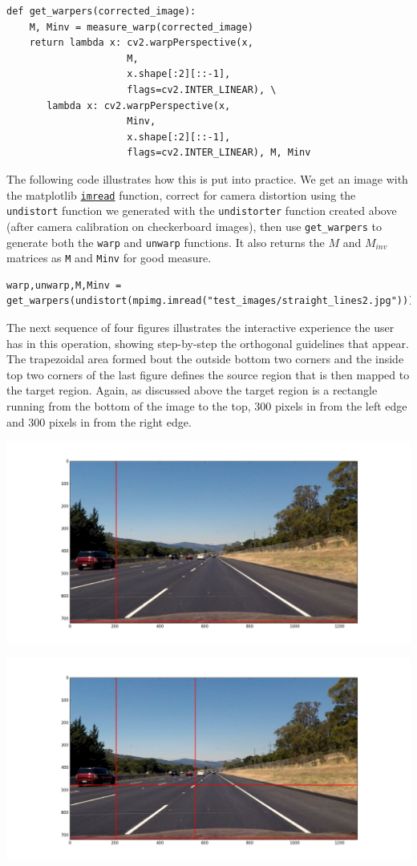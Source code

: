 \documentclass[11pt]{article}
\begin{document}
\begin{verbatim}
def get_warpers(corrected_image):
    M, Minv = measure_warp(corrected_image)
    return lambda x: cv2.warpPerspective(x,
					 M,
					 x.shape[:2][::-1],
					 flags=cv2.INTER_LINEAR), \
	   lambda x: cv2.warpPerspective(x,
					 Minv,
					 x.shape[:2][::-1],
					 flags=cv2.INTER_LINEAR), M, Minv
\end{verbatim}

The following code illustrates how this is put into practice.
We get an image with the matplotlib \href{http://matplotlib.org/api/image_api.html#matplotlib.image.imread}{\texttt{imread}} function, correct
for camera distortion using the \texttt{undistort} function we
generated with the \texttt{undistorter} function created above (after
camera calibration on checkerboard images), then use
\texttt{get\_warpers} to generate both the \texttt{warp} and \texttt{unwarp}
functions.  It also returns the $M$ and $M_{inv}$ matrices as
\texttt{M} and \texttt{Minv} for good measure.

\begin{verbatim}
warp,unwarp,M,Minv = get_warpers(undistort(mpimg.imread("test_images/straight_lines2.jpg")))
\end{verbatim}

The next sequence of four figures illustrates the interactive
experience the user has in this operation, showing step-by-step
the orthogonal guidelines that appear.  The trapezoidal area
formed bout the outside bottom two corners and the inside top
two corners of the last figure defines the source region that is
then mapped to the target region.  Again, as discussed above the
target region is a rectangle running from the bottom of the
image to the top, 300 pixels in from the left edge and 300
pixels in from the right edge.

\includegraphics[width=.9\linewidth]{output_images/figure_3-1.png}

\includegraphics[width=.9\linewidth]{output_images/figure_3-2.png}
\end{document}
